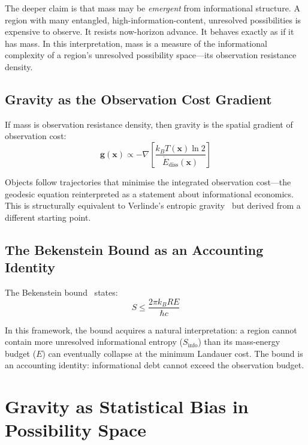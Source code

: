 \documentclass[12pt,a4paper]{article}
\begin{document}
The deeper claim is that mass may be \emph{emergent} from informational structure. A region with many entangled, high-information-content, unresolved possibilities is expensive to observe. It resists now-horizon advance. It behaves exactly as if it has mass. In this interpretation, mass is a measure of the informational complexity of a region's unresolved possibility space---its observation resistance density.

\subsection{Gravity as the Observation Cost Gradient}

If mass is observation resistance density, then gravity is the spatial gradient of observation cost:
\begin{equation}
    \mathbf{g}(\mathbf{x}) \propto -\nabla \left[\frac{k_B T(\mathbf{x}) \ln 2}{\dot{E}_{\mathrm{diss}}(\mathbf{x})}\right]
\end{equation}

Objects follow trajectories that minimise the integrated observation cost---the geodesic equation reinterpreted as a statement about informational economics. This is structurally equivalent to Verlinde's entropic gravity~\cite{Verlinde2011} but derived from a different starting point.

\subsection{The Bekenstein Bound as an Accounting Identity}

The Bekenstein bound~\cite{Bekenstein1981} states:
\begin{equation}
    S \leq \frac{2\pi k_B R E}{\hbar c}
\end{equation}

In this framework, the bound acquires a natural interpretation: a region cannot contain more unresolved informational entropy ($S_{\mathrm{info}}$) than its mass-energy budget ($E$) can eventually collapse at the minimum Landauer cost. The bound is an accounting identity: informational debt cannot exceed the observation budget.

\section{Gravity as Statistical Bias in Possibility Space}
\label{sec:gravity_statistical}
\end{document}
